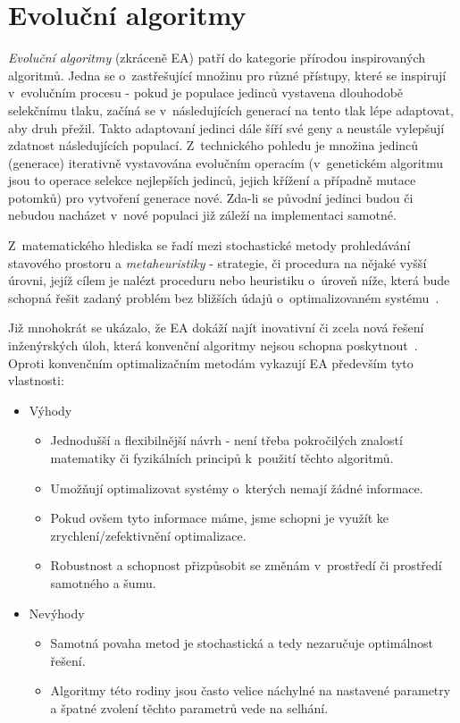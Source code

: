 \chapter{Evoluční algoritmy} 
\label{algs}
\textit{Evoluční algoritmy} (zkráceně EA) patří do kategorie přírodou inspirovaných algoritmů. Jedna se o~zastřešující množinu pro různé přístupy, které se inspirují v~evolučním procesu - pokud je populace jedinců vystavena dlouhodobě selekčnímu tlaku, začíná se v~následujících generací na tento tlak lépe adaptovat, aby druh přežil. Takto adaptovaní jedinci dále šíří své geny a neustále vylepšují zdatnost následujících populací. Z~technického pohledu je množina jedinců (generace) iterativně vystavována evolučním operacím (v~genetickém algoritmu jsou to operace selekce nejlepších jedinců, jejich křížení a případně mutace potomků) pro vytvoření generace nové. Zda-li se původní jedinci budou či nebudou nacházet v~nové populaci již záleží na implementaci samotné. 

Z~matematického hlediska se řadí mezi stochastické metody prohledávání stavového prostoru a \textit{metaheuristiky} - strategie, či procedura na nějaké vyšší úrovni, jejíž cílem je nalézt proceduru nebo heuristiku o~úroveň níže, která bude schopná řešit zadaný problém bez bližších údajů o~optimalizovaném systému~\cite{EA_OVERVIEW}.

Již mnohokrát se ukázalo, že EA dokáží najít inovativní či zcela nová řešení inženýrských úloh, která konvenční algoritmy nejsou schopna poskytnout~\cite{EVO}. \\

\noindent Oproti konvenčním optimalizačním metodám vykazují EA především tyto vlastnosti:
\begin{itemize}
    \item Výhody \begin{itemize}
         \item Jednodušší a flexibilnější návrh - není třeba pokročilých znalostí matematiky či fyzikálních principů k~použití těchto algoritmů.
         \item Umožňují optimalizovat systémy o~kterých nemají žádné informace. 
        \item Pokud ovšem tyto informace máme, jsme schopni je využít ke zrychlení/zefektivnění optimalizace.
        \item Robustnost a schopnost přizpůsobit se změnám v~prostředí či prostředí samotného a šumu.
        \end{itemize}
    \item Nevýhody \begin{itemize}
        \item Samotná povaha metod je stochastická a tedy nezaručuje optimálnost řešení.
        \item Algoritmy této rodiny jsou často velice náchylné na nastavené parametry a špatné zvolení těchto parametrů vede na selhání.
        \end{itemize}
\end{itemize}

